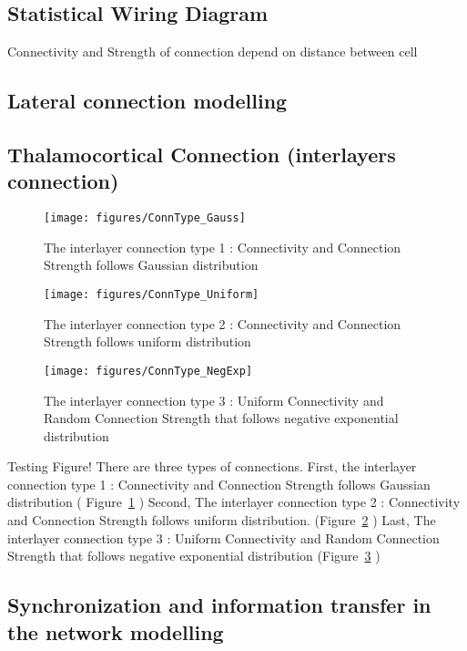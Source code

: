 \subsection{Statistical Wiring Diagram}
Connectivity and  Strength of connection depend on distance between cell~\cite{ringach2004haphazard,mclaughlin2000neuronal}


\subsection{Lateral connection modelling}



\subsection{Thalamocortical Connection (interlayers connection)}


\begin{figure}
	\centering
	\texttt{[image: figures/ConnType\_Gauss]}
	\label{fig:ConnGauss}
	\caption{The interlayer connection type 1 : Connectivity and Connection Strength follows Gaussian distribution}
\end{figure}


\begin{figure}
	\centering
	\texttt{[image: figures/ConnType\_Uniform]}
	\label{fig:ConnUniform}
	\caption{The interlayer connection type 2 : Connectivity and Connection Strength follows uniform distribution}
\end{figure}

\begin{figure}
	\centering
	\texttt{[image: figures/ConnType\_NegExp]}
	\label{fig:ConnNegExp}
	\caption{The interlayer connection type 3 : Uniform Connectivity and Random Connection Strength that follows negative exponential distribution}
\end{figure}


Testing Figure! There are three types of connections. First,   the interlayer connection type 1 : Connectivity and Connection Strength follows Gaussian distribution ( Figure~\ref{fig:ConnGauss} )
Second, The interlayer connection type 2 : Connectivity and Connection Strength follows uniform distribution. (Figure~\ref{fig:ConnUniform} ) 
Last, The interlayer connection type 3 : Uniform Connectivity and Random Connection Strength that follows negative exponential distribution (Figure~\ref{fig:ConnNegExp} )

\subsection{Synchronization and information transfer in the network modelling}



